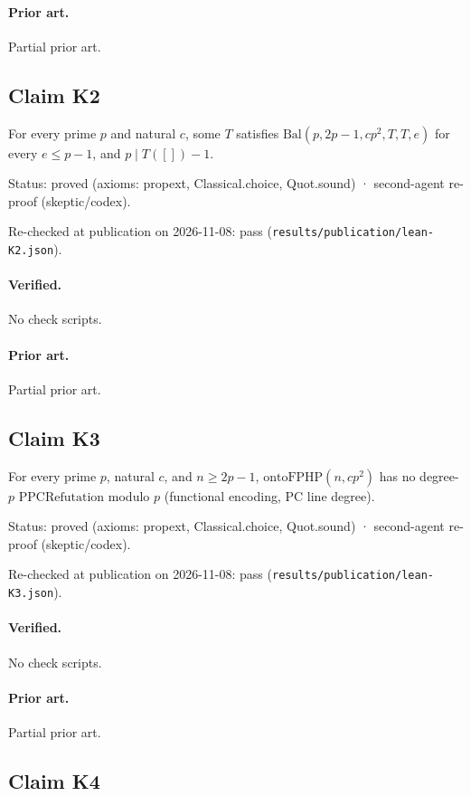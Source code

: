 \documentclass{article}
\begin{document}
\paragraph{Prior art.} Partial prior art.

\subsection*{Claim K2}

For every prime $p$ and natural $c$, some $T$ satisfies $\mathrm{Bal}(p,2p-1,cp^2,T,T,e)$ for every $e\le p-1$, and $p\mid T([])-1$.

Status: proved (axioms: propext, Classical.choice, Quot.sound) · second-agent re-proof (skeptic/codex).

Re-checked at publication on 2026-11-08: pass (\texttt{results/publication/lean-K2.json}).

\paragraph{Verified.}
No check scripts.

\paragraph{Prior art.} Partial prior art.

\subsection*{Claim K3}

For every prime $p$, natural $c$, and $n\ge2p-1$, $\mathrm{ontoFPHP}(n,cp^2)$ has no degree-$p$ $\mathrm{PPCRefutation}$ modulo $p$ (functional encoding, PC line degree).

Status: proved (axioms: propext, Classical.choice, Quot.sound) · second-agent re-proof (skeptic/codex).

Re-checked at publication on 2026-11-08: pass (\texttt{results/publication/lean-K3.json}).

\paragraph{Verified.}
No check scripts.

\paragraph{Prior art.} Partial prior art.

\subsection*{Claim K4}
\end{document}
